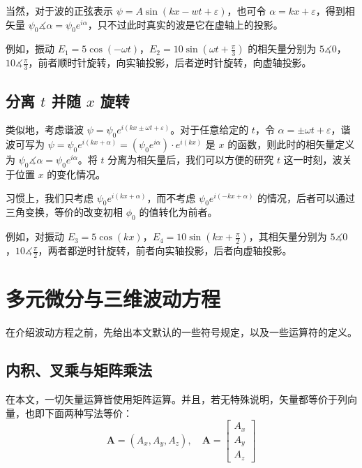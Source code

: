 \documentclass[UTF8]{report}
\theoremstyle{MyLineTheoremStyle} %
\theoremstyle{MyBlockTheoremStyle} %
\theoremstyle{MySubsubsectionStyle} %
\begin{document}
当然，对于波的正弦表示 $\psi = A \sin (kx - wt + \varepsilon)$，也可令  $\alpha = kx + \varepsilon$，得到相矢量 $\psi_0 \measuredangle \alpha = \psi_0 e^{i \alpha}$，只不过此时真实的波是它在虚轴上的投影。

例如，振动 $E_1 = 5 \cos (-\omega t)$，$E_2 = 10 \sin (\omega t + \frac{\pi}{3} )$ 的相矢量分别为 $5 \measuredangle 0$，$10 \measuredangle \frac{\pi}{3} $，前者顺时针旋转，向实轴投影，后者逆时针旋转，向虚轴投影。

\subsection{分离 $t$ 并随 $x$ 旋转}

类似地，考虑谐波 $\psi = \psi_0 e^{i(kx \pm \omega t + \varepsilon)}$。对于任意给定的 $t$，令 $\alpha = \pm \omega t + \varepsilon$，谐波可写为 $\psi = \psi_0 e^{i(kx + \alpha)} = (\psi_0 e^{i \alpha})\cdot e^{i(kx)} $ 是 $x$ 的函数，则此时的相矢量定义为 $ \psi_0 \measuredangle \alpha = \psi_0 e^{i \alpha}$。将 $t$ 分离为相矢量后，我们可以方便的研究 $t$ 这一时刻，波关于位置 $x$ 的变化情况。

习惯上，我们只考虑 $\psi_0 e^{i(kx + \alpha)}$，而不考虑 $\psi_0 e^{i(-kx + \alpha)}$ 的情况，后者可以通过三角变换，等价的改变初相 $\phi_0$ 的值转化为前者。 

例如，对振动 $E_3 = 5 \cos (kx)$，$E_4 = 10 \sin (kx + \frac{\pi}{2} )$，其相矢量分别为 $5 \measuredangle 0$，$10 \measuredangle \frac{\pi}{2} $，两者都逆时针旋转，前者向实轴投影，后者向虚轴投影。



\section{多元微分与三维波动方程}\label{波动方程}

在介绍波动方程之前，先给出本文默认的一些符号规定，以及一些运算符的定义。

\subsection{内积、叉乘与矩阵乘法}

在本文，一切矢量运算皆使用矩阵运算。并且，若无特殊说明，矢量都等价于列向量，也即下面两种写法等价：
\begin{equation}
    \boldsymbol{A} = (A_x, A_y, A_z),\quad \boldsymbol{A} = \begin{bmatrix} A_x \\ A_y \\ A_z \end{bmatrix}
\end{equation}
\end{document}
